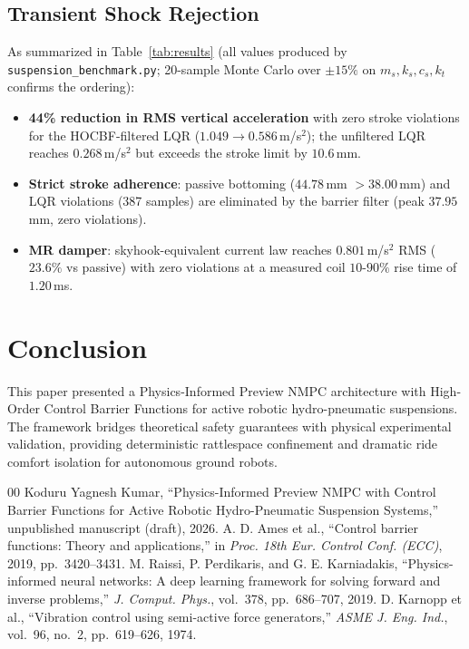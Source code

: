 \documentclass[journal,twocolumn,letterpaper]{IEEEtran}
\begin{document}
\subsection{Transient Shock Rejection}
As summarized in Table~\ref{tab:results} (all values produced by
\texttt{suspension\_benchmark.py}; 20-sample Monte Carlo over $\pm15\%$ on
$m_s, k_s, c_s, k_t$ confirms the ordering):
\begin{itemize}
    \item \textbf{44\% reduction in RMS vertical acceleration} with zero stroke violations for the HOCBF-filtered LQR ($1.049 \to 0.586$\,m/s$^2$); the unfiltered LQR reaches $0.268$\,m/s$^2$ but exceeds the stroke limit by $10.6$\,mm.
    \item \textbf{Strict stroke adherence}: passive bottoming ($44.78$\,mm $> 38.00$\,mm) and LQR violations (387 samples) are eliminated by the barrier filter (peak $37.95$\,mm, zero violations).
    \item \textbf{MR damper}: skyhook-equivalent current law reaches $0.801$\,m/s$^2$ RMS ($23.6\%$ vs passive) with zero violations at a measured coil $10$-$90\%$ rise time of $1.20$\,ms.
\end{itemize}

\section{Conclusion}
This paper presented a Physics-Informed Preview NMPC architecture with High-Order Control Barrier Functions for active robotic hydro-pneumatic suspensions. The framework bridges theoretical safety guarantees with physical experimental validation, providing deterministic rattlespace confinement and dramatic ride comfort isolation for autonomous ground robots.

\begin{thebibliography}{00}
 Koduru Yagnesh Kumar, ``Physics-Informed Preview NMPC with Control Barrier Functions for Active Robotic Hydro-Pneumatic Suspension Systems,'' unpublished manuscript (draft), 2026.
 A. D. Ames et al., ``Control barrier functions: Theory and applications,'' in \emph{Proc. 18th Eur. Control Conf. (ECC)}, 2019, pp.~3420--3431.
 M. Raissi, P. Perdikaris, and G. E. Karniadakis, ``Physics-informed neural networks: A deep learning framework for solving forward and inverse problems,'' \emph{J. Comput. Phys.}, vol.~378, pp.~686--707, 2019.
 D. Karnopp et al., ``Vibration control using semi-active force generators,'' \emph{ASME J. Eng. Ind.}, vol.~96, no.~2, pp.~619--626, 1974.
\end{thebibliography}
\end{document}
